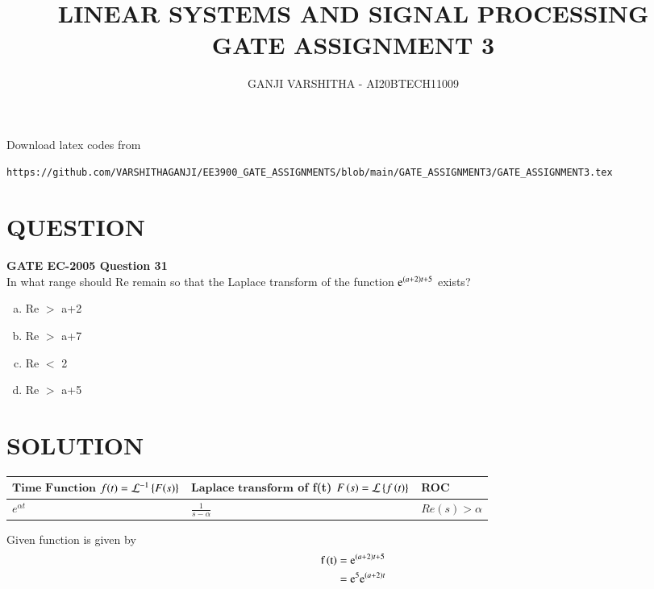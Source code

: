 \documentclass[journal,12pt,twocolumn]{IEEEtran}
\begin{document}
\let\vec\mathbf
\renewcommand{\thefigure}{\theproblem}
\def\putbox#1#2#3{\makebox[0in][l]{\makebox[#1][l]{}\raisebox{\baselineskip}[0in][0in]{\raisebox{#2}[0in][0in]{#3}}}}
     \def\rightbox#1{\makebox[0in][r]{#1}}
     \def\centbox#1{\makebox[0in]{#1}}
     \def\topbox#1{\raisebox{-\baselineskip}[0in][0in]{#1}}
     \def\midbox#1{\raisebox{-0.5\baselineskip}[0in][0in]{#1}}
\vspace{3cm}
\title{\textbf{LINEAR SYSTEMS AND SIGNAL PROCESSING \\ GATE ASSIGNMENT 3}}
\author{GANJI VARSHITHA - AI20BTECH11009}
\maketitle
\newpage
\bigskip
\renewcommand{\thefigure}{\arabic{figure}}
\renewcommand{\thetable}{\arabic{table}}
Download latex codes from 
%
\begin{lstlisting}
https://github.com/VARSHITHAGANJI/EE3900_GATE_ASSIGNMENTS/blob/main/GATE_ASSIGNMENT3/GATE_ASSIGNMENT3.tex
\end{lstlisting}

\section*{QUESTION}
\textbf{GATE EC-2005 Question 31}
\\
In what range should Re remain so that the Laplace transform of the function $\text{e}^{\left(a+2\right)t+5}$ exists?

\begin{enumerate}[(a)]
   \item  Re $>$ a+2
   \item  Re $>$ a+7
   \item  Re $<$ 2
   \item  Re $>$ a+5
   
\end{enumerate}
\section*{SOLUTION}


\begin{lemma}

\begin{center}
\begin{tabular}{ |m{3cm}|m{4.5cm}|m{1.5cm}| } 
 \hline
 $\textbf{Time Function}$ $f(t)=\mathcal{L}^{-1}\left\{F(s)\right\}$ & $\textbf{Laplace transform}$ of f(t) $F\left(s\right)=\mathcal{L}\left\{f\left(t\right)\right\}$ & \textbf{ROC} \\ 
 \hline
 $e^{\alpha t}$ & $\frac{1}{s-\alpha}$ & $Re(s)>\alpha$\\[1ex]

 \hline
\end{tabular}
\end{center}


\end{lemma}
Given function is given by
\begin{align}
\label{eq:1}
\text{f}\left(\text{t}\right)={}& \text{e}^{\left(a+2\right)t+5}\\
\label{eq:2}
={}& \text{e}^5 \text{e}^{\left(a+2\right)t}
\end{align}
\end{document}
